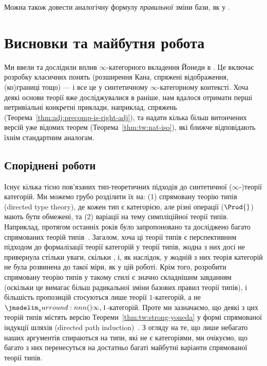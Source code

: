 \documentclass[12pt]{article}
\newcommand{\parencite}{\cite}
\let\prn\DelimPrn
\begin{document}
Можна також довести аналогічну формулу \emph{правильної} зміни бази, як у \cite[Теорема 8.4.6]{cisinski:2024}.
\section{Висновки та майбутня робота}
\label{sec:conc}

Ми ввели та дослідили вплив $\infty$-категорного вкладення Йонеди в \STT{}. Це включає розробку класичних понять (розширення Кана, спряжені відображення, (ко)границі тощо) — і все це у синтетичному $\infty$-категорному контексті. Хоча деякі основи теорії вже досліджувалися в \STT{} раніше, нам вдалося отримати перші нетривіальні конкретні приклади, наприклад, спряжень (Теорема~\ref{thm:adj:precomp-is-right-adj}), та надати кілька більш витончених версій уже відомих теорем (Теорема~\ref{thm:tw:nat-iso}), які ближче відповідають їхнім стандартним аналогам.

\subsection{Споріднені роботи}

Існує кілька тісно пов'язаних тип-теоретичних підходів до синтетичної ($\infty$-)теорії категорій. Ми можемо грубо розділити їх на: (1) спрямовану теорію типів (directed type theory), де кожен тип є категорією, але різні операції ($\Prod{}$) мають бути обмежені, та (2) варіації на тему симпліційної теорії типів. Наприклад, протягом останніх років було запропоновано та досліджено багато спрямованих теорій типів~\parencite{%
  licata:2011,%
  warren:2013,%
  nuyts:2015,%
  kavvos:directed:2019,%
  buchholtz:2019,%
  kolomatskaia:2023,%
  weaver:2020,%
  weaver:phd,%
  ahrens:2023,%
  north:2018,%
  nuyts:2020,%
  neumann:2024,%
  }.
Загалом, хоча ці теорії типів є перспективним підходом до формалізації теорії категорій у теорії типів, жодна з них досі не привернула стільки уваги, скільки \STT{}, і, як наслідок, у жодній з них теорія категорій не була розвинена до такої міри, як у цій роботі. Крім того, розробити спрямовану теорію типів у такому стилі є значно складнішим завданням (оскільки це вимагає більш радикальної зміни базових правил теорії типів), і більшість пропозицій стосуються лише теорії $1$-категорій, а не $\prn{\infty,1}$-категорій. Проте ми зазначаємо, що деякі з цих теорій типів містять версію Теореми~\ref{thm:tw:strong-yoneda} у формі спрямованої індукції шляхів (directed path induction)~\parencite{north:2018,nuyts:2020,neumann:2024}. З огляду на те, що лише небагато наших аргументів спираються на типи, які не є категоріями, ми очікуємо, що багато з них перенесуться на достатньо багаті майбутні варіанти спрямованої теорії типів.
\end{document}

